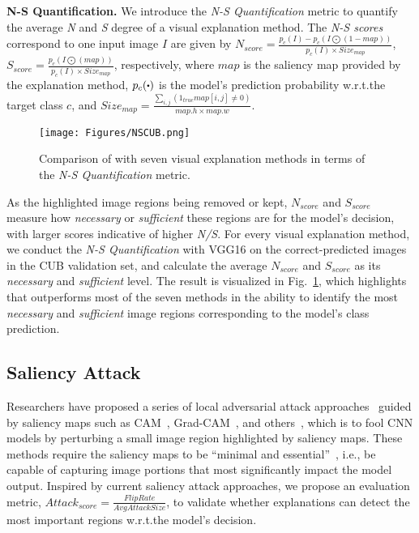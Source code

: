 \noindent \textbf{N-S Quantification.}
We introduce the \textit{N-S Quantification} metric to quantify the average \textit{N} and \textit{S} degree of a visual explanation method.
The \textit{N-S scores} correspond to one input image $I$ are given by $N_{score}=\frac{p_{c}(I)-p_{c}(I\bigodot(1 - map))}{p_{c}(I)\times Size_{map}}$, $S_{score}=\frac{p_{c}(I\bigodot(map))}{p_{c}(I)\times Size_{map}}$, respectively,
where $map$ is the saliency map provided by the explanation method, $p_{c}(\bigcdot)$ is the model's prediction probability w.r.t.\;the target class $c$, and $Size_{map}=\frac{\sum_{i, j}(1_{true}map[i, j] \neq 0)}{map.h\times map.w}$.
\begin{figure}[bhtp]
  \centering
   \texttt{[image: Figures/NSCUB.png]}
   \caption{Comparison of \name{} with seven visual explanation methods in terms of the \textit{N-S Quantification} metric.}
   \label{fig:NSCUB}
\end{figure}
As the highlighted image regions being removed or kept, $N_{score}$ and $S_{score}$ measure how \textit{necessary} or \textit{sufficient} these regions are for the model's decision, with larger scores indicative of higher \textit{N/S}.
For every visual explanation method, we conduct the \textit{N-S Quantification} with VGG16 on the correct-predicted images in the CUB validation set, and calculate the average $N_{score}$ and $S_{score}$ as its \textit{necessary} and \textit{sufficient} level.
The result is visualized in Fig.~\ref{fig:NSCUB}, which highlights that \name{} outperforms most of the seven methods in the ability to identify the most \textit{necessary} and \textit{sufficient} image regions corresponding to the model's class prediction. 



\subsection{Saliency Attack}
Researchers have proposed a series of local adversarial attack approaches~\cite{dong2020robust, wang2022attention, xiang2021local, dai2022saliency} guided by saliency maps such as CAM~\cite{dong2020robust,wang2022attention}, Grad-CAM~\cite{xiang2021local}, and others~\cite{dai2022saliency}, which is to fool CNN models by perturbing a small image region highlighted by saliency maps.
These methods require the saliency maps to be ``minimal and essential''~\cite{dai2022saliency}, i.e., be capable of capturing image portions that most significantly impact the model output.
Inspired by current saliency attack approaches, we propose an evaluation metric, $Attack_{score}=\frac{FlipRate}{AvgAttackSize}$, to validate whether \name{} explanations can detect the most important regions w.r.t.\;the model's decision.

